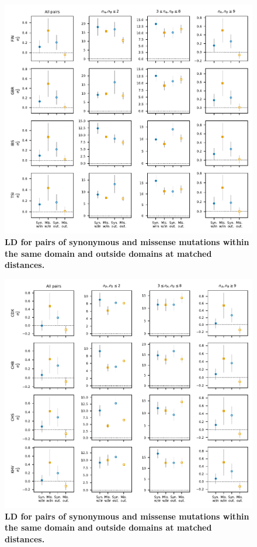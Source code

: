 \documentclass[]{article}
\begin{document}
\begin{figure}[ht!]
    \centering
    \includegraphics{../figures/data_domains_eur}
    \caption{
        \textbf{LD for pairs of synonymous and missense mutations within the
        same domain and outside domains at matched distances.}
    }
    \label{fig:domainsEUR}
\end{figure}

\begin{figure}[ht!]
    \centering
    \includegraphics{../figures/data_domains_eas}
    \caption{
        \textbf{LD for pairs of synonymous and missense mutations within the
        same domain and outside domains at matched distances.}
    }
    \label{fig:domainsEAS}
\end{figure}
\end{document}
